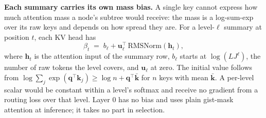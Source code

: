 \documentclass[10pt,twocolumn]{article}
\newcommand{\para}[1]{\noindent\textbf{#1}\hspace{0.5em}}
\begin{document}
\para{Each summary carries its own mass bias.}
A single key cannot express how much attention mass a node's subtree would receive: the mass
is a log-sum-exp over its raw keys and depends on how spread they are. For a level-$\ell$
summary at position $t$, each KV head has
\begin{equation}
  \beta_t \;=\; b_\ell + \mathbf{u}_\ell^{\top}\,\mathrm{RMSNorm}(\mathbf{h}_t),
  \label{eq:beta}
\end{equation}
where $\mathbf{h}_t$ is the attention input of the summary row, $b_\ell$ starts at
$\log(LJ^{\ell})$, the number of raw tokens the level covers, and $\mathbf{u}_\ell$ at zero.
The initial value follows from
$\log\sum_{j}\exp(\mathbf{q}^\top\mathbf{k}_j)\ge\log n+\mathbf{q}^\top\bar{\mathbf{k}}$ for
$n$ keys with mean $\bar{\mathbf{k}}$. A per-level scalar would be constant within a level's
softmax and receive no gradient from a routing loss over that level. Layer 0 has no bias and
uses plain gist-mask attention at inference; it takes no part in selection.
\end{document}
